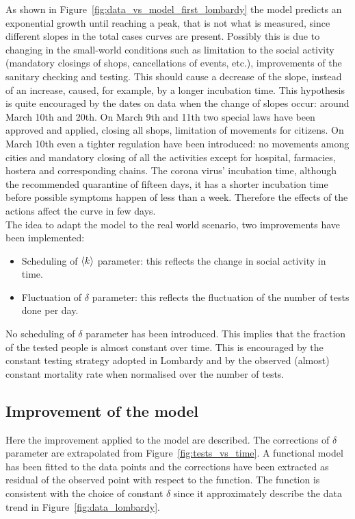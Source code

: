 As shown in Figure~\ref{fig:data_vs_model_first_lombardy} the model predicts an exponential growth until reaching a peak, that is not what is measured, since different slopes in the total cases curves are present. Possibly this is due to changing in the small-world conditions such as limitation to the social activity (mandatory closings of shops, cancellations of events, etc.), improvements of the sanitary checking and testing. This should cause a decrease of the slope, instead of an increase, caused, for example, by a longer incubation time. This hypothesis is quite encouraged by the dates on data when the change of slopes occur: around March 10th and 20th. On March 9th and 11th two special laws have been approved and applied, closing all shops, limitation of movements for citizens. On March 10th even a tighter regulation have been introduced: no movements among cities and mandatory closing of all the activities except for hospital, farmacies, hostera and corresponding chains. The corona virus' incubation time, although the recommended quarantine of fifteen days, it has a shorter incubation time before possible symptoms happen of less than a week. Therefore the effects of the actions affect the curve in few days.\\

The idea to adapt the model to the real world scenario, two improvements have been implemented:
\begin{itemize}
\item Scheduling of $\braket{k}$ parameter: this reflects the change in social activity in time.
\item Fluctuation of $\delta$ parameter: this reflects the fluctuation of the number of tests done per day.
\end{itemize}

No scheduling of $\delta$ parameter has been introduced. This implies that the fraction of the tested people is almost constant over time. This is encouraged by the constant testing strategy adopted in Lombardy and by the observed (almost) constant mortality rate  when normalised over the number of tests.\\



\subsection{Improvement of the model}
\label{ssec:impr_model}
Here the improvement applied to the model are described. The corrections of $\delta$ parameter are extrapolated from Figure~\ref{fig:tests_vs_time}. A functional model has been fitted to the data points and the corrections have been extracted as residual of the observed point with respect to the function. The function is consistent with the choice of constant $\delta$ since it approximately describe the data trend in Figure~\ref{fig:data_lombardy}.\\


